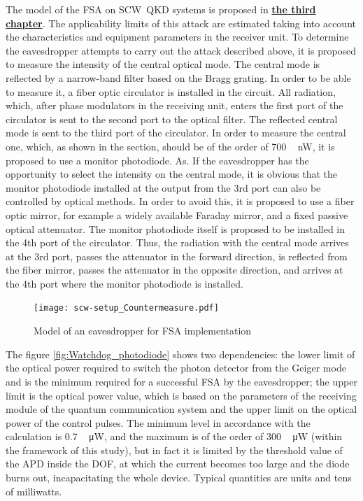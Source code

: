 The model of the FSA on SCW~QKD systems is proposed in  \underline{\textbf{the third chapter}}. The applicability limits of this attack are estimated taking into account the characteristics and equipment parameters in the receiver unit. To determine the eavesdropper attempts to carry out the attack described above, it is proposed to measure the intensity of the central optical mode. The central mode is reflected by a narrow-band filter based on the Bragg grating. In order to be able to measure it, a fiber optic circulator is installed in the circuit. All radiation, which, after phase modulators in the receiving unit, enters the first port of the circulator is sent to the second port to the optical filter. The reflected central mode is sent to the third port of the circulator. In order to measure the central one, which, as shown in the section, should be of the order of 700 ~ nW, it is proposed to use a monitor photodiode. As. If the eavesdropper has the opportunity to select the intensity on the central mode, it is obvious that the monitor photodiode installed at the output from the 3rd port can also be controlled by optical methods. In order to avoid this, it is proposed to use a fiber optic mirror, for example a widely available Faraday mirror, and a fixed passive optical attenuator. The monitor photodiode itself is proposed to be installed in the 4th port of the circulator. Thus, the radiation with the central mode arrives at the 3rd port, passes the attenuator in the forward direction, is reflected from the fiber mirror, passes the attenuator in the opposite direction, and arrives at the 4th port where the monitor photodiode is installed.       
 \begin{figure}[ht]
  \centering
  \texttt{[image: scw-setup\_Countermeasure.pdf]}
  \caption{Model of an eavesdropper for FSA implementation}
  \label{fig:countermeasure}
\end{figure}


The figure \ref{fig:Watchdog_photodiode} shows two dependencies: the lower limit of the optical power required to switch the photon detector from the Geiger mode and is the minimum required for a successful FSA by the eavesdropper; the upper limit is the optical power value, which is based on the parameters of the receiving module of the quantum communication system and the upper limit on the optical power of the control pulses. The minimum level in accordance with the calculation is 0.7 ~ μW, and the maximum is of the order of 300 ~ μW (within the framework of this study), but in fact it is limited by the threshold value of the APD inside the DOF, at which the current becomes too large and the diode burns out, incapacitating the whole device. Typical quantities are units and tens of milliwatts.
 
